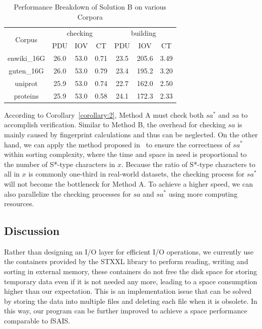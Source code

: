 \documentclass[10pt,journal,compsoc]{IEEEtran}
\begin{document}
{%
\begin{table}%
	\caption{Performance Breakdown of Solution B on various Corpora}
	\label{tbl:breakdown_solutionb}
	\centering
	\begin{tabular}{|c|c|c|c|c|c|c|}
		\hline
		\multirow{2}{*}{Corpus} & \multicolumn{3}{|c}{checking} & \multicolumn{3}{|c|}{building} \\\cline{2-7}
		& PDU & IOV & CT & PDU & IOV & CT \\\hline
		enwiki\_16G & 26.0 & 53.0 & 0.71 & 23.5 & 205.6 & 3.49 \\\hline
		guten\_16G & 26.0 & 53.0 & 0.79 & 23.4 & 195.2 & 3.20 \\\hline
		uniprot & 25.9 & 53.0 & 0.74 & 22.7 & 162.0 & 2.50 \\\hline
		proteins & 25.9 & 53.0 & 0.58 & 24.1 & 172.3 & 2.33 \\\hline
	\end{tabular}
\end{table}%

According to Corollary~\ref{corollary:2}, Method A must check both $sa^*$ and $sa$ to accomplish verification. Similar to Method B, the overhead for checking $sa$ is mainly caused by fingerprint calculations and thus can be neglected. On the other hand, we can apply the method proposed in~\cite{wu2017} to ensure the correctness of $sa^*$ within sorting complexity, where the time and space in need is proportional to the number of S*-type characters in $x$. Because the ratio of S*-type characters to all in $x$ is commonly one-third in real-world datasets, the checking process for $sa^*$ will not become the bottleneck for Method A. To achieve a higher speed, we can also parallelize the checking processes for $sa$ and $sa^*$ using more computing resources.

\subsection{Discussion}

Rather than designing an I/O layer for efficient I/O operations, we currently use the containers provided by the STXXL library to perform reading, writing and sorting in external memory, these containers do not free the disk space for storing temporary data even if it is not needed any more, leading to a space consumption higher than our expectation. This is an implementation issue that can be solved by storing the data into multiple files and deleting each file when it is obsolete. In this way, our program can be further improved to achieve a space performance comparable to fSAIS. 

}
\end{document}

